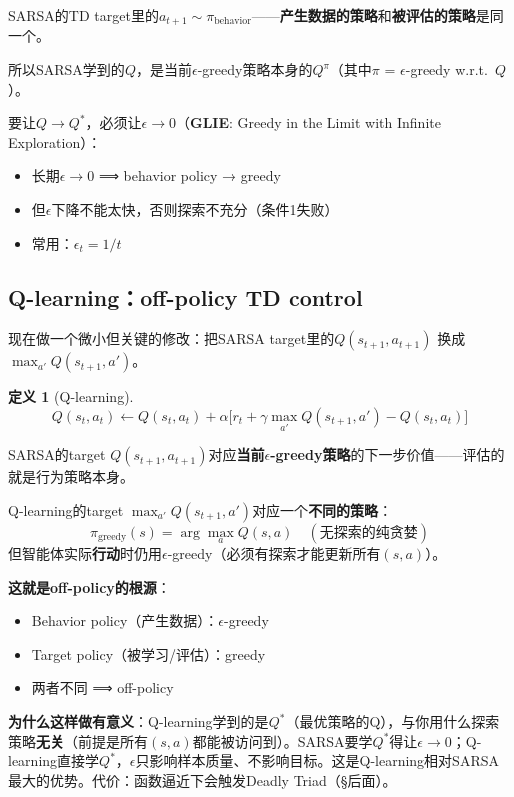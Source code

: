 \documentclass[11pt,a4paper]{article}
\theoremstyle{definition}
\newtheorem{definition}{定义}[section]
\begin{document}
\begin{keypoint}
SARSA的TD target里的$a_{t+1}\sim \pi_{\text{behavior}}$——\textbf{产生数据的策略}和\textbf{被评估的策略}是同一个。

所以SARSA学到的$Q$，是当前$\epsilon$-greedy策略本身的$Q^\pi$（其中$\pi$ = $\epsilon$-greedy w.r.t.\ $Q$）。

要让$Q \to Q^*$，必须让$\epsilon \to 0$（\textbf{GLIE}: Greedy in the Limit with Infinite Exploration）：
\begin{itemize}
\item 长期$\epsilon \to 0$ ⟹ behavior policy → greedy
\item 但$\epsilon$下降不能太快，否则探索不充分（条件1失败）
\item 常用：$\epsilon_t = 1/t$
\end{itemize}
\end{keypoint}

\subsection{Q-learning：off-policy TD control}

现在做一个微小但关键的修改：把SARSA target里的$Q(s_{t+1}, a_{t+1})$ 换成$\max_{a'} Q(s_{t+1}, a')$。

\begin{definition}[Q-learning]
\[
Q(s_t, a_t) \leftarrow Q(s_t, a_t) + \alpha\big[r_t + \gamma \max_{a'} Q(s_{t+1}, a') - Q(s_t, a_t)\big]
\]
\end{definition}

\begin{magicbox}
SARSA的target $Q(s_{t+1}, a_{t+1})$对应\textbf{当前$\epsilon$-greedy策略}的下一步价值——评估的就是行为策略本身。

Q-learning的target $\max_{a'} Q(s_{t+1}, a')$对应一个\textbf{不同的策略}：
\[
\pi_{\text{greedy}}(s) = \arg\max_a Q(s, a) \quad (\text{无探索的纯贪婪})
\]
但智能体实际\textbf{行动}时仍用$\epsilon$-greedy（必须有探索才能更新所有$(s,a)$）。

\textbf{这就是off-policy的根源}：
\begin{itemize}
\item Behavior policy（产生数据）：$\epsilon$-greedy
\item Target policy（被学习/评估）：greedy
\item 两者不同 ⟹ off-policy
\end{itemize}

\textbf{为什么这样做有意义}：Q-learning学到的是$Q^*$（最优策略的Q），与你用什么探索策略\textbf{无关}（前提是所有$(s,a)$都能被访问到）。SARSA要学$Q^*$得让$\epsilon\to 0$；Q-learning直接学$Q^*$，$\epsilon$只影响样本质量、不影响目标。这是Q-learning相对SARSA最大的优势。代价：函数逼近下会触发Deadly Triad（§后面）。
\end{magicbox}
\end{document}
